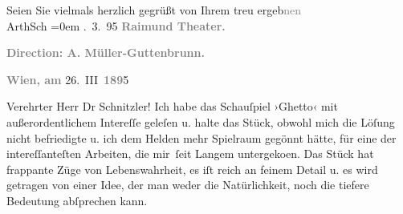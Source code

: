 \pstart
           Seien Sie vielmals herzlich gegrüßt von Ihrem treu ergeb\textcolor{gray}{nen}{\\[\baselineskip]}\spacefill\mbox{ArthSch}\pend
           \leftskip=0em{}
. 3. 95\pend
           \vspace{1em}{\vspace{1\baselineskip}}
\pstart
           \centering{}{\pb}\textcolor{gray}{\textbf{Raimund Theater.}}\pend
           
\pstart
           \centering{}\textcolor{gray}{\textbf{Direction: A.
                        Müller-Guttenbrunn.}}\pend
           
\pstart
           \raggedleft{}\textcolor{gray}{\textbf{Wien, am}}{ }26. III \textcolor{gray}{\textbf{189}}5\pend
           
\pstart{}Verehrter Herr Dr Schnitzler!\pend\vspace{0.5em}
\pstart
           Ich habe das Schauſpiel ›Ghetto‹ mit
               außerordentlichem Intereſſe geleſen u. halte das Stück, obwohl mich die Löſung nicht befriedigte u. ich dem
               Helden mehr Spielraum gegönnt hätte, für eine der intereſſanteſten Arbeiten, die
               mir ſeit Langem untergeko{\geminationm}en. Das Stück hat frappante Züge von Lebenswahrheit, es
               iſt reich an feinem Detail u. es wird getragen {\pb}von einer
               Idee, der man weder die Natürlichkeit, noch die tiefere Bedeutung abſprechen
               kann.\pend
           
